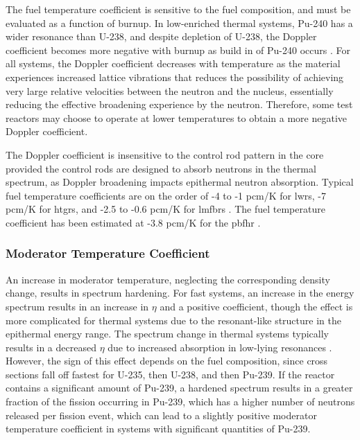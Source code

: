 
The fuel temperature coefficient is sensitive to the fuel composition, and must be evaluated as a function of burnup. In low-enriched thermal systems, Pu-240 has a wider resonance than U-238, and despite depletion of U-238, the Doppler coefficient becomes more negative with burnup as build in of Pu-240 occurs \cite{duderstadt,fratoni}. For all systems, the Doppler coefficient decreases with temperature as the material experiences increased lattice vibrations that reduces the possibility of achieving very large relative velocities between the neutron and the nucleus, essentially reducing the effective broadening experience by the neutron. Therefore, some test reactors may choose to operate at lower temperatures to obtain a more negative Doppler coefficient.

The Doppler coefficient is insensitive to the control rod pattern in the core provided the control rods are designed to absorb neutrons in the thermal spectrum, as Doppler broadening impacts epithermal neutron absorption. Typical fuel temperature coefficients are on the order of -4 to -1 pcm/K for \glspl{lwr}, -7 pcm/K for \glspl{htgr}, and -2.5 to -0.6 pcm/K for \glspl{lmfbr} \cite{duderstadt}. The fuel temperature coefficient has been estimated at -3.8 pcm/K for the \gls{pbfhr} \cite{xin_wang_thesis}.

\subsubsection{Moderator Temperature Coefficient}
An increase in moderator temperature, neglecting the corresponding density change, results in spectrum hardening. For fast systems, an increase in the energy spectrum results in an increase in \(\eta\) and a positive coefficient, though the effect is more complicated for thermal systems due to the resonant-like structure in the epithermal energy range. The spectrum change in thermal systems typically results in a decreased \(\eta\) due to increased absorption in low-lying resonances \cite{duderstadt}. However, the sign of this effect depends on the fuel composition, since cross sections fall off fastest for U-235, then U-238, and then Pu-239. If the reactor contains a significant amount of Pu-239, a hardened spectrum results in a greater fraction of the fission occurring in Pu-239, which has a higher number of neutrons released per fission event, which can lead to a slightly positive moderator temperature coefficient in systems with significant quantities of Pu-239. 

